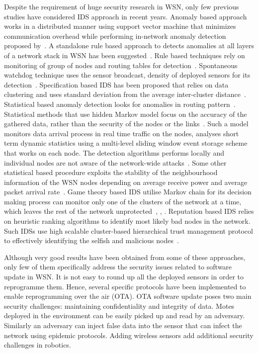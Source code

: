 \documentclass[conference,final]{IEEEtran}
\begin{document}
Despite the requirement of huge security research in WSN, only few previous studies have considered IDS approach in recent years.
Anomaly based approach works in a distributed manner using support vector machine that minimizes communication overhead while performing in-network anomaly detection proposed by~\cite{ISI:000257882502160}.
A standalone rule based approach to detects anomalies at all layers of a network stack in WSN has been suggested~\cite{ISI:000232429900067}.
Rule based  techniques rely on monitoring of group of nodes and routing tables for detection~\cite{ISI:000298891500099, Chen:2009:NMI:1516241.1516282, 1424814, Strikos_afull}.
Spontaneous watchdog technique uses the sensor broadcast, density of deployed sensors for its detection~\cite{1593102}.
Specification based  IDS has been proposed that relies on data clustering and uses standard deviation from the average inter-cluster distance~\cite{Chen:2009:NMI:1516241.1516282, 1424814, Strikos_afull, 4085803}. 
Statistical based anomaly  detection looks for anomalies in routing pattern~\cite{4024996}.
Statistical methods that use hidden Markov model focus on the accuracy of the gathered data, rather than the security of the nodes or the links~\cite{1290173}.
Such a model monitors data arrival process in real time traffic on the nodes, analyses short term dynamic statistics using a multi-level sliding window event storage scheme that works on each node. The detection algorithms performs locally and individual nodes are not aware of the network-wide attacks~\cite{1515559}.
Some other statistical based procedure exploits the stability of the neighbourhood information of the WSN nodes depending on average receive power and average packet arrival rate~\cite{1512911}.
Game theory based IDS utilise Markov chain for its decision making process can monitor only one of the clusters of the network at a time, which leaves the rest of the network unprotected~\cite{1347798}, \cite{Das07preventingdos}, \cite{Reddy:2009:GTA:1607720.1607944}.
Reputation based IDS relies on heuristic ranking algorithms to identify most likely bad nodes in the network.
Such IDSs use high scalable cluster-based hierarchical trust management protocol to effectively identifying the selfish and malicious nodes~\cite{6174485}.

Although very good results have been obtained from some of these approaches, only few of them specifically address the security issues related to software update in WSN.
It is not easy to round up all the deployed sensors in order to reprogramme them. 
Hence, several specific protocols have been implemented  to enable reprogramming over the air (OTA).
OTA software update poses two main security challenges: maintaining confidentiality and integrity of data. 
Motes deployed in the environment can be easily picked up and read by an adversary.
Similarly an adversary can inject false data into the sensor that can infect the network using epidemic protocols. 
Adding wireless sensors add additional security challenges in robotics.
\end{document}
